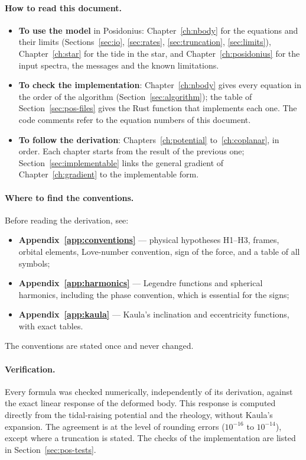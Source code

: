\paragraph{How to read this document.}
\begin{itemize}
  \item \textbf{To use the model} in Posidonius: Chapter~\ref{ch:nbody} for the equations and their limits (Sections~\ref{sec:io}, \ref{sec:rates}, \ref{sec:truncation}, \ref{sec:limits}), Chapter~\ref{ch:star} for the tide in the star, and Chapter~\ref{ch:posidonius} for the input spectra, the messages and the known limitations.
  \item \textbf{To check the implementation}: Chapter~\ref{ch:nbody} gives every equation in the order of the algorithm (Section~\ref{sec:algorithm}); the table of Section~\ref{sec:pos-files} gives the Rust function that implements each one. The code comments refer to the equation numbers of this document.
  \item \textbf{To follow the derivation}: Chapters~\ref{ch:potential} to~\ref{ch:coplanar}, in order. Each chapter starts from the result of the previous one; Section~\ref{sec:implementable} links the general gradient of Chapter~\ref{ch:gradient} to the implementable form.
\end{itemize}

\paragraph{Where to find the conventions.} Before reading the derivation, see:
\begin{itemize}
  \item \textbf{Appendix~\ref{app:conventions}} — physical hypotheses H1--H3, frames, orbital elements, Love-number convention, sign of the force, and a table of all symbols;
  \item \textbf{Appendix~\ref{app:harmonics}} — Legendre functions and spherical harmonics, including the phase convention, which is essential for the signs;
  \item \textbf{Appendix~\ref{app:kaula}} — Kaula's inclination and eccentricity functions, with exact tables.
\end{itemize}
The conventions are stated once and never changed.

\paragraph{Verification.} Every formula was checked numerically, independently of its derivation, against the exact linear response of the deformed body. This response is computed directly from the tidal-raising potential and the rheology, without Kaula's expansion. The agreement is at the level of rounding errors ($10^{-16}$ to $10^{-14}$), except where a truncation is stated. The checks of the implementation are listed in Section~\ref{sec:pos-tests}.

